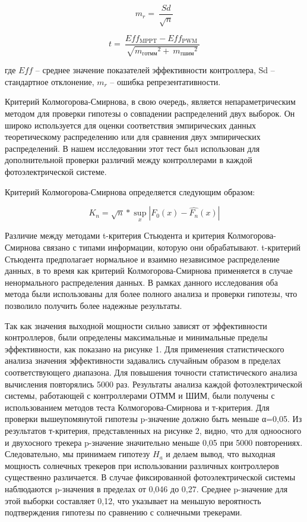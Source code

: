 \begin{multicols}{2}
\begin{equation}
m_{r} = \ \frac{Sd}{\sqrt{n}}
\end{equation}

\begin{equation}
t = \ \frac{{Eff}_{\text{MPPT}} - {Eff}_{\text{PWM}}\ }{\sqrt{{m_{\text{rотмм}}}^{2} + \ {m_{\text{rшим}}}^{2}}}
\end{equation}

где \(\underline{Eff}\) -- среднее значение показателей эффективности
контроллера, Sd -- стандартное отклонение, \(m_{r}\) -- ошибка
репрезентативности.

Критерий Колмогорова-Смирнова, в свою очередь, является
непараметрическим методом для проверки гипотезы о совпадении
распределений двух выборок. Он широко используется для оценки
соответствия эмпирических данных теоретическому распределению или для
сравнения двух эмпирических распределений. В нашем исследовании этот
тест был использован для дополнительной проверки различий между
контроллерами в каждой фотоэлектрической системе.

Критерий Колмогорова-Смирнова определяется следующим образом:

\begin{equation}
K_{n} = \sqrt{n}*\sup_{x}\left| F_{0}(x) - \widehat{F_{n}}(x) \right|
\end{equation}

Различие между методами t-критерия Стьюдента и критерия
Колмогорова-Смирнова связано с типами информации, которую они
обрабатывают. t-критерий Стьюдента предполагает нормальное и взаимно
независимое распределение данных, в то время как критерий
Колмогорова-Смирнова применяется в случае ненормального распределения
данных. В рамках данного исследования оба метода были использованы для
более полного анализа и проверки гипотезы, что позволило получить более
надежные результаты.

Так как значения выходной мощности сильно зависят от эффективности
контроллеров, были определены максимальные и минимальные пределы
эффективности, как показано на рисунке 1. Для применения статистического
анализа значения эффективности задавались случайным образом в пределах
соответствующего диапазона. Для повышения точности статистического
анализа вычисления повторялись 5000 раз. Результаты анализа каждой
фотоэлектрической системы, работающей с контроллерами ОТММ и ШИМ, были
получены с использованием методов теста Колмогорова-Смирнова и
т-критерия. Для проверки вышеупомянутой гипотезы p-значение должно быть
меньше α=0,05. Из результатов т-критерия, представленных на рисунке 2,
видно, что для одноосного и двухосного трекера p-значение значительно
меньше 0,05 при 5000 повторениях. Следовательно, мы принимаем гипотезу
\(H_{a}\) и делаем вывод, что выходная мощность солнечных трекеров при
использовании различных контроллеров существенно различается. В случае
фиксированной фотоэлектрической системы наблюдаются p-значения в
пределах от 0,046 до 0,27. Среднее p-значение для этой выборки
составляет 0,12, что указывает на меньшую вероятность подтверждения
гипотезы по сравнению с солнечными трекерами.


\end{multicols}
